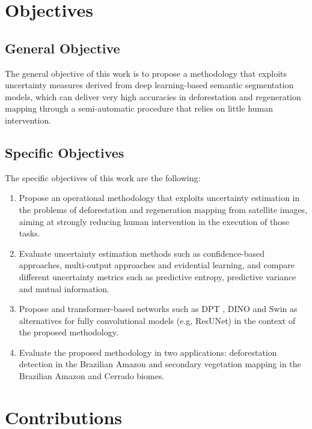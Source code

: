 \section{Objectives}
\subsection{General Objective}

The general objective of this work is to propose a methodology that exploits uncertainty measures derived from deep learning-based semantic segmentation models, which can deliver very high accuracies in deforestation and regeneration mapping through a semi-automatic procedure that relies on little human intervention.

\subsection{Specific Objectives}

The specific objectives of this work are the following:
\begin{enumerate}
\item Propose an operational methodology that exploits uncertainty estimation in the problems of deforestation and regeneration mapping from satellite images, aiming at strongly reducing human intervention in the execution of those tasks.
\item Evaluate uncertainty estimation methods such as confidence-based approaches, multi-output approaches and evidential learning, and compare different uncertainty metrics such as predictive entropy, predictive variance and mutual information.
\item Propose and  transformer-based networks such as DPT \cite{ranftl2021vision}, DINO \cite{zhang2022dino} and Swin \cite{liu2021swin} as alternatives for fully convolutional models (e.g, ResUNet) in the context of the proposed methodology.
\item Evaluate the proposed methodology in two applications: deforestation detection in the Brazilian Amazon and secondary vegetation mapping in the Brazilian Amazon and Cerrado biomes.

\end{enumerate}



\section{Contributions}

